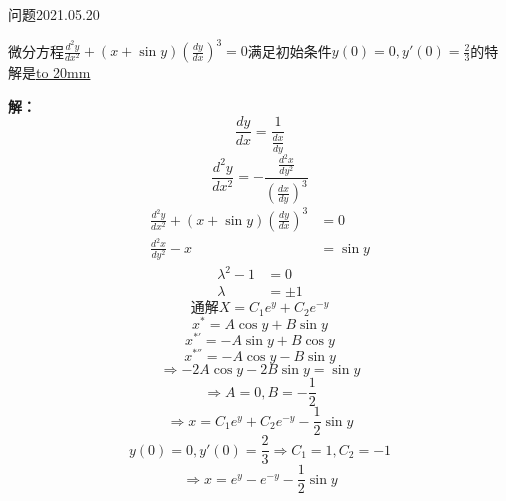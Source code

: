 \begin{mybox}{问题2021.05.20}
	
	\qquad 微分方程$\frac{d^2 y}{d x^2}+(x+\sin y) (\frac{dy}{dx})^3=0$满足初始条件$y(0)=0,y'(0)=\frac{2}{3}$的特解是\underline{\hbox to 20mm{}}
\end{mybox}
\noindent
\textbf{解：}
$$\frac{dy}{dx}=\frac{1}{\frac{dx}{dy}}$$
$$\frac{d^2y}{dx^2}=-\frac{\frac{d^2x}{dy^2}}{(\frac{dx}{dy})^3}$$
\begin{align*}
	\frac{d^2 y}{d x^2}+(x+\sin y) (\frac{dy}{dx})^3&=0\\
	\frac{d^2 x}{dy^2}-x&=\sin y
\end{align*}
\begin{align*}
	\lambda^2 -1&=0\\
	\lambda&=\pm 1
\end{align*}
$$\text{通解}X=C_{1} e^{y}+C_{2}e^{-y}$$
$$x^{*} =A\cos y+B\sin y$$
$$x^{*'} =-A\sin y+B\cos y$$
$$x^{*''}=-A\cos y-B\sin y$$
$$\Rightarrow -2A\cos y-2B\sin y =\sin y$$
$$\Rightarrow A=0,B=-\frac{1}{2}$$
$$\Rightarrow x=C_{1} e^{y}+C_{2}e^{-y}-\frac{1}{2}\sin y$$
$$y(0)=0,y'(0)=\frac{2}{3} \Rightarrow C_{1}=1,C_{2}=-1$$
$$\Rightarrow x=e^y-e^{-y} -\frac{1}{2}\sin y$$